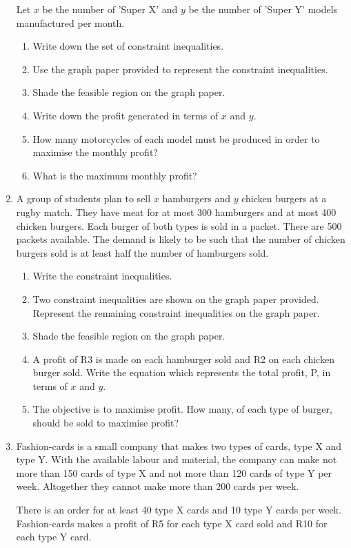 \begin{enumerate}
{Let $x$ be the number of 'Super X' and $y$ be the number of 'Super Y' models
manufactured per month.

\begin{enumerate}
\item{Write down the set of constraint inequalities.}
\item{Use the graph paper provided to represent the constraint inequalities.}
\item{Shade the feasible region on the graph paper.}
\item{Write down the profit generated in terms of $x$ and $y$.}
\item{How many motorcycles of each model must be produced in order to maximise the monthly profit?}
\item{What is the maximum monthly profit?}
\end{enumerate}
}
\item{A group of students plan to sell $x$ hamburgers and $y$ chicken burgers at a rugby match. They have meat for at most 300 hamburgers and at most 400 chicken burgers. Each burger of
both types is sold in a packet. There are 500 packets available. The demand is likely to be such that the number of chicken burgers sold is at least half the number of hamburgers sold.
\begin{enumerate}
\item{Write the constraint inequalities.}
\item{Two constraint inequalities are shown on the graph paper provided. Represent the remaining constraint inequalities on the graph paper.}
\item{Shade the feasible region on the graph paper.}
\item{A profit of R3 is made on each hamburger sold and R2 on each chicken burger sold. Write the equation which represents the total profit, P, in terms of $x$ and $y$.}
\item{The objective is to maximise profit. How many, of each type of burger, should be sold to maximise profit?}
\end{enumerate}}

\item{Fashion-cards is a small company that makes two types of cards, type X and type Y. With the available labour and material, the company can make not more than 150 cards of type X and not more than 120 cards of type Y per week. Altogether they cannot make more than 200 cards per week.

There is an order for at least 40 type X cards and 10 type Y cards per week.
Fashion-cards makes a profit of R5 for each type X card sold and R10 for each type Y card.

}
\end{enumerate}
